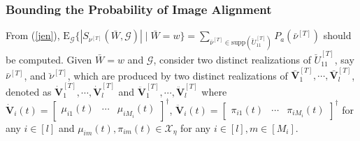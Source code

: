 \documentclass[11pt]{article}
\begin{document}
\subsubsection{Bounding the Probability of Image Alignment}
From (\ref{jen}),  $\mbox{E}_{\mathcal{G}}\{|S_{\nu^{[T]}}(\bar{W},\mathcal{G})|\mid \bar{W}=w\}=\sum_{\bar{\nu}^{[T]}\in\mbox{supp}(\breve{U}_{11}^{[T]})}P_a(\bar{\nu}^{[T]})$ should be computed. Given $\bar{W}=w$ and $\mathcal{G}$, consider two distinct realizations of $\breve{U}_{11}^{[T]}$, say $\bar{\nu}^{[T]}$, and $\breve{\nu}^{[T]}$, which are produced by two distinct  realizations of $\bar{\mathbf{V}}_1^{[T]},\cdots,\bar{\mathbf{V}}_l^{[T]}$, denoted as $\dot{\mathbf{V}}_1^{[T]},\cdots,\dot{\mathbf{V}}_l^{[T]}$ and $\ddot{\mathbf{V}}_1^{[T]},\cdots,\ddot{\mathbf{V}}_l^{[T]}$ where $\dot{\mathbf{V}}_i(t)=\begin{bmatrix}\mu_{i1}(t)&\cdots&\mu_{iM_i}(t)\end{bmatrix}^\dagger$, $\ddot{\mathbf{V}}_i(t)=\begin{bmatrix}\pi_{i1}(t)&\cdots&\pi_{iM_i}(t)\end{bmatrix}^\dagger$ for any $i\in[l]$ and $\mu_{im}(t),\pi_{im}(t)\in\mathcal{X}_{\eta}$ for any $i\in[l],m\in[M_i]$. 
\end{document}
